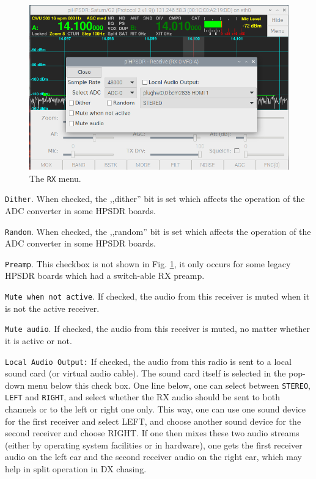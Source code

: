 \documentclass[12pt]{book}
\def\rett#1{\texttt{\color{red}#1}}
\def\bltt#1{\texttt{\color{blue}#1}}
\begin{document}
\begin{figure}[ht!]
\center
\includegraphics[width=12cm]{RXMenu.png}
\caption{The \bltt{RX} menu.}
\label{fig:RXMenu}
\end{figure}

\rett{Dither}. When checked, the ,,dither'' bit is set which affects the operation of
the ADC converter in some HPSDR boards.

\rett{Random}. When checked, the ,,random'' bit is set which affects the operation of
the ADC converter in some HPSDR boards.

\rett{Preamp}. This checkbox is not shown in Fig. \ref{fig:RXMenu}, it only occurs
for some legacy HPSDR boards which had a switch-able RX preamp.

\rett{Mute when not active}. If checked, the audio from this receiver is muted when
it is not the active receiver.

\rett{Mute audio}. If checked, the audio from this receiver is muted, no matter whether
it is active or not.

\rett{Local Audio Output:} If checked, the audio from this radio is sent to a local
sound card (or virtual audio cable). The sound card itself is selected in the
pop-down menu below this check box. One line below, one can select between 
\texttt{STEREO}, \texttt{LEFT} and \texttt{RIGHT}, and select whether the RX
audio should be sent to both channels or to the left or right one only. This way,
one can use one sound device for the first receiver and select LEFT,
and choose another sound device for the second
receiver and choose RIGHT. If one then mixes these two audio streams (either by
operating system facilities or in hardware), one gets the first receiver audio
on the left ear and the second receiver audio on the right ear, which may help
in split operation in DX chasing.
 
\end{document}
